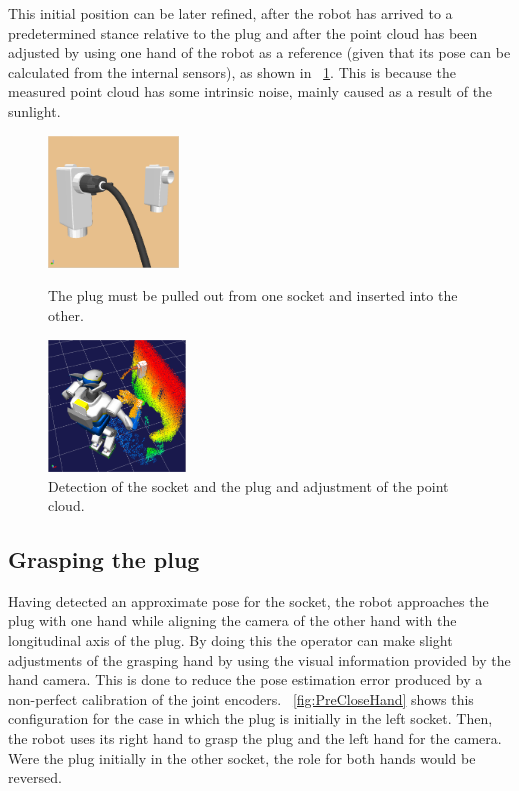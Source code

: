 		This initial position can be later refined, after the robot has arrived to a predetermined stance
		relative to the plug and after the point cloud has been adjusted by using one hand of the robot as
		a reference (given that its pose can be calculated from the internal sensors), as shown in
		\figurename~\ref{fig:SocketPlugMarker}.
		This is because the measured point cloud has some intrinsic noise, mainly caused as a result of
		the sunlight.

		\begin{figure}[b]
			\centering
			\begin{minipage}[t]{0.475\linewidth}
				\centering
				\includegraphics[height = 3.5cm]{img/Sockets-Plug}
				\caption{The plug must be pulled out from one socket and inserted into the other.}
				\label{fig:Sockets-Plug}
			\end{minipage}
			\hspace{0.1cm}
			\begin{minipage}[t]{0.475\linewidth}
				\centering
				\includegraphics[height = 3.5cm]{img/SocketPlugMarker}
				\caption{Detection of the socket and the plug and adjustment of the point cloud.}
				\label{fig:SocketPlugMarker}
			\end{minipage}
		\end{figure}
		
	\subsection{Grasping the plug}
		\label{sub:GraspPlug}
		
		Having detected an approximate pose for the socket, the robot approaches the plug
		with one hand while aligning the camera of the other hand with the longitudinal axis
		of the plug.
		By doing this the operator can make slight adjustments of the grasping hand
		by using the visual information provided by the hand camera.
		This is done to reduce the pose estimation error produced by a non-perfect calibration
		of the joint encoders. 
		\figurename~\ref{fig:PreCloseHand} shows this configuration for the case in which the plug
		is initially in the left socket.
		Then, the robot uses its right hand to grasp the plug and the left hand for the camera.
		Were the plug initially in the other socket, the role for both hands would be reversed.
		
